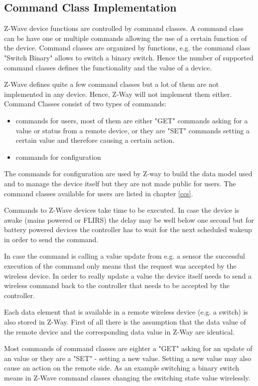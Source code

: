 \subsection{Command Class Implementation} 
 
Z-Wave device functions are controlled by command classes. A command class can be have one or  multiple commands
allowing the use of a certain function of the device. Command classes are organized by functions, e.g. the command class "Switch Binary" allows to switch 
a binary switch. Hence the number of supported command classes defines the functionality and the value of 
a device.

Z-Wave defines quite a few command classes but a lot of them are not implemented in any device. Hence, Z-Way will not implement them 
either. Command Classes consist of two types of commands:
\begin{itemize}
\item commands for users, most of them are either "GET" commands asking for a value or status from a remote device, or they are "SET" commands setting
 a certain value and therefore causing a certain action.
\item commands for configuration
 \end{itemize}

The commands for configuration are used by Z-way to build the data model used and to manage the device itself but they are not made public for users. 
The command classes available for users are listed in chapter \ref {ccs}.

Commands to Z-Wave devices take time to be executed. In case the device is awake (mains powered or FLIRS) the delay may be well below one second but for 
battery powered  devices the controller has to wait for the next scheduled wakeup in order to send the command. 

In case the command is calling a value update from e.g. a sensor the successful execution of the command only means that the request was accepted by the
wireless device. In order to really update a value the device itself needs to send a wireless command back to the controller that needs to be accepted by the 
controller.    

Each data element that is available in a remote wireless device (e.g. a switch) is also stored in  Z-Way. First of all there is the assumption that the data value of the remote device
and the corresponding data value in Z-Way are identical.

 Most commands of command classes are eighter a "GET" asking for an update of an value or they are a "SET" - setting a new value. Setting a new 
 value may also cause an action on the remote side. As an example switching a binary switch means in Z-Wave command classes changing the switching  
 state value wirelessly.

